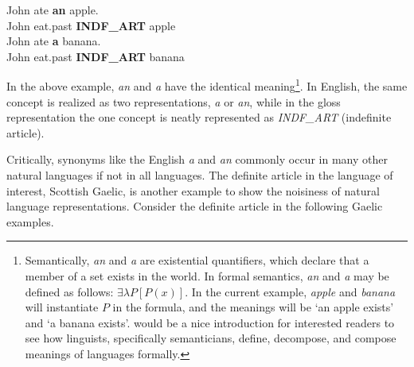 \documentclass[final]{ua-thesis}
\begin{document}
\begin{exe}  
\ex \gll John ate \textbf{an} apple.\\
	John eat.past	\textbf{INDF\_ART} apple\\
\ex \gll John ate \textbf{a} banana.\\
	John eat.past   \textbf{INDF\_ART} banana\\
\end{exe}

In the above example, \textit{an} and \textit{a} have the identical meaning\footnote{Semantically, \textit{an} and \textit{a} are existential quantifiers, which declare that a member of a set exists in the world. In formal semantics, \textit{an} and \textit{a} may be defined as follows: $\exists\lambda P[P(x)]$. In the current example, \textit{apple} and \textit{banana} will instantiate $P$ in the formula, and the meanings will be `an apple exists' and `a banana exists'. \citet{kratzer1998semantics} would be a nice introduction for interested readers to see how linguists, specifically semanticians, define, decompose, and compose meanings of languages formally.}. 
In English, the same concept is realized as two representations, \textit{a} or \textit{an}, while in the gloss representation the one concept is neatly represented as \textit{INDF\_ART} (indefinite article). 

Critically, synonyms like the English \textit{a} and \textit{an} commonly occur in many other natural languages if not in all languages. The definite article in the language of interest, Scottish Gaelic, is another example to show the noisiness of natural language representations. Consider the definite article in the following Gaelic examples. 
\end{document}
